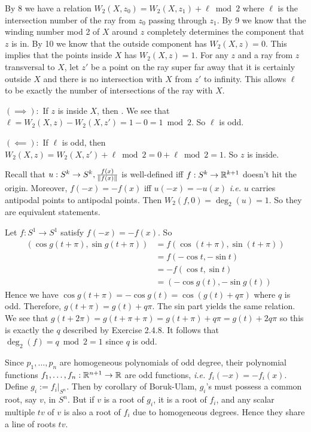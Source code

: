 \documentclass[12pt]{article}
\begin{document}
\begin{problem}[2.5.12]
By 8 we have a relation $ W_2(X,z_0) = W_2(X,z_1) + \ell \bmod 2$ where $ \ell$ is the intersection number of the ray from $ z_0$ passing through $ z_1$. By 9 we know that the winding number mod 2 of $ X$ around  $ z$ completely determines the component that  $ z$ is in. By 10 we know that the outside component has  $ W_2(X,z) = 0$. This implies that the points inside $ X$ has  $ W_2(X,z) = 1$. For any $ z$ and a ray from $ z$ transversal to $ X$, let $ z'$ be a point on the ray super far away that it is certainly outside $ X$ and there is no intersection with $ X$ from  $ z'$ to infinity. This allows $ \ell$ to be exactly the number of intersections of the ray with $ X$.

$ (\implies):$ If $ z$ is inside  $ X$, then . We see that $ \ell = W_2(X,z) - W_2(X,z') = 1-0 = 1 \bmod 2$. So $ \ell$ is odd.

$ (\impliedby):$ If $ \ell$ is odd, then $ W_2(X,z) = W_2(X,z') + \ell \bmod 2 = 0+ \ell \bmod 2 = 1$. So $ z$ is inside.
\end{problem}

\begin{problem}[2.6.1]
Recall that  $ u:S^{k} \to S^{k}, \frac{f(x)}{ {\left\lVert{ f(x)}\right\rVert} }$ is well-defined iff $ f:S^{k} \to \mathbb{R}^{k+1}$ doesn't hit the origin. Moreover, $ f(-x) = -f(x)$ iff $ u(-x) = -u(x)$ \emph{i.e.} $ u$ carries antipodal points to antipodal points. Then $ W_2(f,0) = \deg_2(u) =1$. So they are equivalent statements.
\end{problem}
\begin{problem}[2.6.2]
Let $ f:S^{1} \to S^{1}$ satisfy $ f(-x) = -f(x)$. So
\begin{align*}
	(\cos g(t+ \pi), \sin g(t+\pi)) &=  f(\cos (t+ \pi), \sin(t+ \pi))\\
					&= f(-\cos t, -\sin t)\\ 
					&= -f(\cos t, \sin t)\\ 
					&= (-\cos g(t), - \sin g(t))
\end{align*}
Hence we have $ \cos g(t+\pi) = -\cos g(t) = \cos (g(t)+q\pi)$ where $ q$ is odd. Therefore,  $ g(t+\pi) = g(t) + q\pi$. The sin part yields the same relation. We see that  $ g(t+2\pi) = g(t+\pi + \pi) = g(t+\pi) + q\pi = g(t)+ 2q \pi$ so this is exactly the $ q$ described by Exercise 2.4.8. It follows that $ \deg_2(f) = q \bmod 2 =1$ since $ q$ is odd.
\end{problem}

\begin{problem}[2.6.3]
Since $ p_1,\ldots,p_n$ are homogeneous polynomials of odd degree, their polynomial functions $ f_1,\ldots,f_n: \mathbb{R}^{n+1} \to \mathbb{R}$ are odd functions, \emph{i.e.} $ f_i(-x) = -f_i(x)$. Define $ g_i:= f_i|_{S^{n}}$. Then by corollary of Boruk-Ulam,  $ g_i$'s must possess a common root, say $ v$, in $ S^{n}$. But if $ v$ is a root of $ g_i$, it is a root of $ f_i$, and any scalar multiple $ tv$ of $ v$ is also a root of $ f_i$ due to homogeneous degrees. Hence they share a line of roots $ tv$.
\end{problem}
\end{document}
